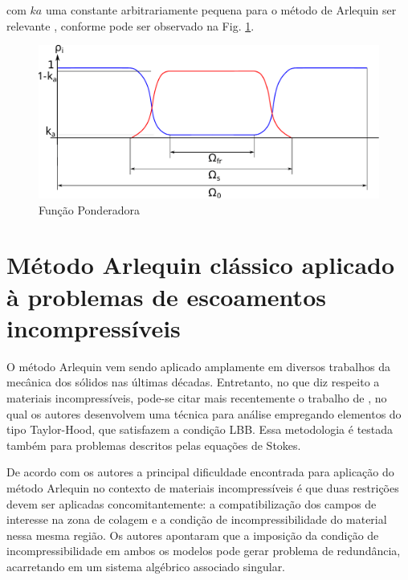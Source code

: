 \documentclass[tese_patricia]{subfiles}
\begin{document}
\noindent com $ka$ uma constante arbitrariamente pequena para o método de Arlequin ser relevante \cite{Dhia:2008}, conforme pode ser observado na Fig. \ref{fig:constanteKa}.


\begin{figure}[htb!]
	\centering 
	\includegraphics[scale=0.6,trim=0cm 0cm 0cm 0.0cm, clip=true]{Imagens/Cap6/ponderadora.pdf}	
	\caption{Função Ponderadora}
	\label{fig:constanteKa}
\end{figure}


\section{Método Arlequin clássico aplicado à problemas de escoamentos incompressíveis}

O método Arlequin vem sendo aplicado amplamente em diversos trabalhos da mecânica dos sólidos nas últimas décadas. Entretanto, no que diz respeito a materiais incompressíveis, pode-se citar mais recentemente o trabalho de , no qual os autores desenvolvem uma técnica para análise empregando elementos do tipo Taylor-Hood, que satisfazem a condição LBB. Essa metodologia é testada também para problemas descritos pelas equações de Stokes.

De acordo com os autores  a principal dificuldade encontrada para aplicação do método Arlequin no contexto de materiais incompressíveis é que duas restrições devem ser aplicadas concomitantemente: a compatibilização dos campos de interesse na zona de colagem e a condição de incompressibilidade do material nessa mesma região. Os autores apontaram que a imposição da condição de incompressibilidade em ambos os modelos pode gerar problema de redundância, acarretando em um sistema algébrico associado singular.
\end{document}
